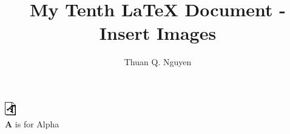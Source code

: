 \documentclass{article}
\begin{document}
\title{My Tenth \LaTeX{} Document - Insert Images}
\author{Thuan Q. Nguyen}
\maketitle


\begin{center}
\includegraphics[scale=0.95]{10-Insert_IMG_Letter_A.png} \\
\textbf A is for Alpha
\end{center}
\end{document}
